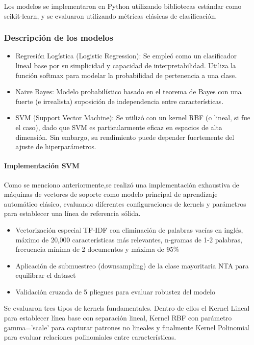 Los modelos se implementaron en Python utilizando bibliotecas estándar como scikit-learn, y se evaluaron utilizando métricas clásicas de clasificación.

\subsubsection{Descripción de los modelos}

\begin{itemize}
    \item Regresión Logística (Logistic Regression): Se empleó como un clasificador lineal base por su simplicidad y capacidad de interpretabilidad. Utiliza la función softmax para modelar la probabilidad de pertenencia a una clase.
    \item Naive Bayes: Modelo probabilístico basado en el teorema de Bayes con una fuerte (e irrealista) suposición de independencia entre características. 
    \item SVM (Support Vector Machine): Se utilizó con un kernel RBF (o lineal, si fue el caso), dado que SVM es particularmente eficaz en espacios de alta dimensión. Sin embargo, su rendimiento puede depender fuertemente del ajuste de hiperparámetros.
\end{itemize}

\paragraph{Implementación SVM}
Como se menciono anteriormente,se realizó una implementación exhaustiva de máquinas de vectores de soporte como modelo principal de aprendizaje automático clásico, evaluando diferentes configuraciones de kernels y parámetros para establecer una línea de referencia sólida.

\begin{itemize}
    \item Vectorización especial TF-IDF con eliminación de palabras vacías en inglés, máximo de 20,000 características más relevantes, n-gramas de 1-2 palabras, frecuencia mínima de 2 documentos y máxima de 95\%
    \item Aplicación de submuestreo (downsampling) de la clase mayoritaria NTA para equilibrar el dataset
    \item Validación cruzada de 5 pliegues para evaluar robustez del modelo
\end{itemize}

Se evaluaron tres tipos de kernels fundamentales. Dentro de ellos el Kernel Lineal para establecer línea base con separación lineal, Kernel RBF con parámetro gamma='scale' para capturar patrones no lineales y finalmente Kernel Polinomial para evaluar relaciones polinomiales entre características.

